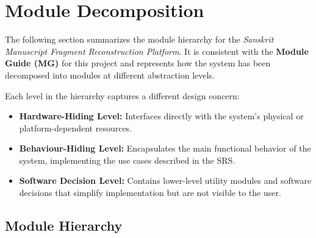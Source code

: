\documentclass[12pt, titlepage]{article}
\begin{document}
\section{Module Decomposition}



The following section summarizes the module hierarchy for the \textit{Sanskrit Manuscript Fragment Reconstruction Platform}. It is consistent with the \textbf{Module Guide (MG)} for this project and represents how the system has been decomposed into modules at different abstraction levels.

Each level in the hierarchy captures a different design concern:

\begin{itemize}
    \item \textbf{Hardware-Hiding Level:} Interfaces directly with the system’s physical or platform-dependent resources.
    \item \textbf{Behaviour-Hiding Level:} Encapsulates the main functional behavior of the system, implementing the use cases described in the SRS.
    \item \textbf{Software Decision Level:} Contains lower-level utility modules and software decisions that simplify implementation but are not visible to the user.
\end{itemize}

\subsection{Module Hierarchy}
\end{document}
